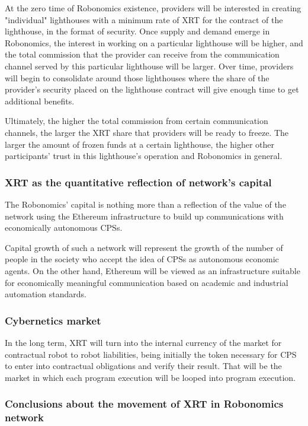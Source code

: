 \documentclass{article}
\begin{document}
At the zero time of Robonomics existence, providers will be interested in creating "individual" lighthouses with a minimum rate of XRT for the contract of the lighthouse, in the format of security. Once supply and demand emerge in Robonomics, the interest in working on a particular lighthouse will be higher, and the total commission that the provider can receive from the communication channel served by this particular lighthouse will be larger. Over time, providers will begin to consolidate around those lighthouses where the share of the provider's security placed on the lighthouse contract will give enough time to get additional benefits.
 
Ultimately, the higher the total commission from certain communication channels, the larger the XRT share that providers will be ready to freeze. The larger the amount of frozen funds at a certain lighthouse, the higher other participants' trust in this lighthouse's operation and Robonomics in general.

\subsubsection{XRT as the quantitative reflection of network's capital}

The Robonomics' capital is nothing more than a reflection of the value of the network using the Ethereum infrastructure to build up communications with economically autonomous CPSs.
 
Capital growth of such a network will represent the growth of the number of people in the society who accept the idea of CPSs as autonomous economic agents. On the other hand, Ethereum will be viewed as an infrastructure suitable for economically meaningful communication based on academic and industrial automation standards.

\subsubsection{Cybernetics market}

In the long term, XRT will turn into the internal currency of the market for contractual robot to robot liabilities, being initially the token necessary for CPS to enter into contractual obligations and verify their result. That will be the market in which each program execution will be looped into program execution.

\subsubsection{Conclusions about the movement of XRT in Robonomics network}
\end{document}
